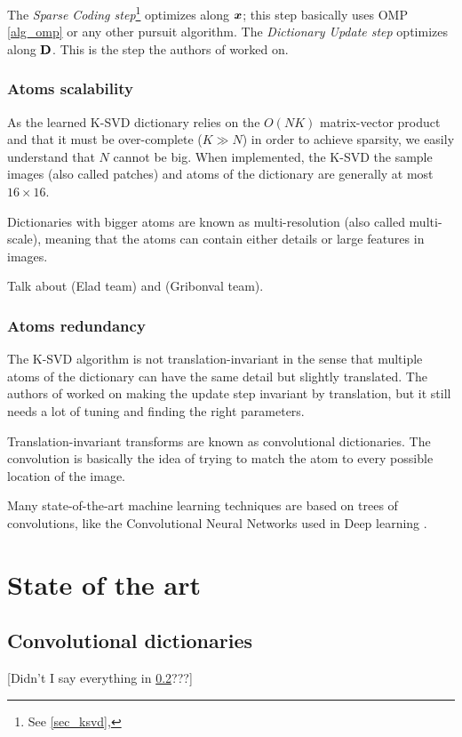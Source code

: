 The \emph{Sparse Coding step}\footnote{See \cref{sec_ksvd}, } optimizes along $\bm{x}$; this step basically uses OMP \cref{alg_omp} or any other pursuit algorithm. The \emph{Dictionary Update step} optimizes along $\mathbf{D}$. This is the step the authors of \cite{chabiron_optimization_2016} worked on.


\subsection{Atoms scalability}
As the learned K-SVD dictionary relies on the $O(NK)$ matrix-vector product and that it must be over-complete ($K \gg N$) in order to achieve sparsity, we easily understand that $N$ cannot be big. When implemented, the K-SVD the sample images (also called patches) and atoms of the dictionary are generally at most $16 \times 16$. 

Dictionaries with bigger atoms are known as multi-resolution (also called multi-scale), meaning that the atoms can contain either details or large features in images.

Talk about \cite{magoarou_learning_2015} (Elad team) and \cite{sulam_trainlets:_2016} (Gribonval team).

\subsection{Atoms redundancy} \label{sec_atoms_redund}
The K-SVD algorithm is not translation-invariant in the sense that multiple atoms of the dictionary can have the same detail but slightly translated. The authors of \cite{mailhe_shift-invariant_2008} worked on making the update step invariant by translation, but it still needs a lot of tuning and finding the right parameters. 

Translation-invariant transforms are known as convolutional dictionaries. The convolution is basically the idea of trying to match the atom to every possible location of the image.

Many state-of-the-art machine learning techniques are based on trees of convolutions, like the Convolutional Neural Networks used in Deep learning \cite{lecun_deep_2015}.


\chapter{State of the art}

\section{Convolutional dictionaries}
[Didn't I say everything in \cref{sec_atoms_redund}???]

